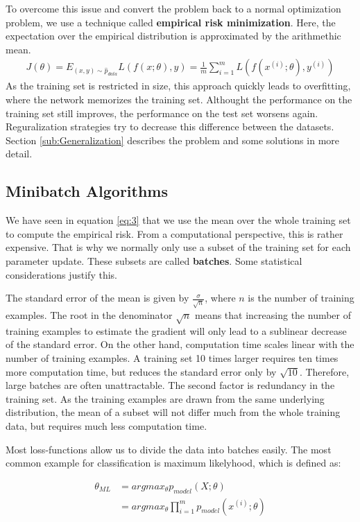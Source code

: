 To overcome this issue and convert the problem back to a normal optimization
problem, we use a technique called \textbf{empirical risk minimization}. Here,
the expectation over the empirical distribution is approximated by the arithmethic
mean.
\begin{align}\label{eq:3}
    J(\theta) = E_{(x,y)\sim \hat{p}_{data}} L(f(x;\theta), y) = \frac{1}{m} \sum_{i=1}^m L(f(x^{(i)}; \theta), y^{(i)})
\end{align}
As the training set is restricted in size, this approach quickly leads to
overfitting, where the network memorizes the training set. Althought the
performance on the training set still improves, the performance on the test set
worsens again. Reguralization strategies try to decrease this difference between
the datasets. Section \ref{sub:Generalization} describes the problem and some
solutions in more detail.


\subsection{Minibatch Algorithms}\label{sub:Minibatch}
We have seen in equation \ref{eq:3} that we use the mean over the whole training
set to compute the empirical risk. From a computational perspective, this is
rather expensive. That is why we normally only use a subset of the training set
for each parameter update. These subsets are called \textbf{batches}. Some statistical
considerations justify this.

The standard error of the mean is given by $\frac{\sigma}{\sqrt{n}}$, where $n$
is the number of training examples. The root in the denominator $\sqrt{n}$ means
that increasing the number of training examples to estimate the gradient will
only lead to a sublinear decrease of the standard error. On the other hand,
computation time scales linear with the number of training examples. A training
set 10 times larger requires ten times more computation time, but reduces the
standard error only by $\sqrt{10}$. Therefore, large batches are often
unattractable. The second factor is redundancy in the training set. As the
training examples are drawn from the same underlying distribution, the mean of a
subset will not differ much from the whole training data, but requires much less
computation time.

Most loss-functions allow us to divide the data into batches easily. The most
common example for classification is maximum likelyhood, which is defined as:

\begin{align}
    \theta_{ML}
    & = argmax_{\theta} p_{model}(X; \theta) \\
    & = argmax_{\theta} \prod_{i=1}^m p_{model}(x^{(i)}; \theta)
\end{align}

